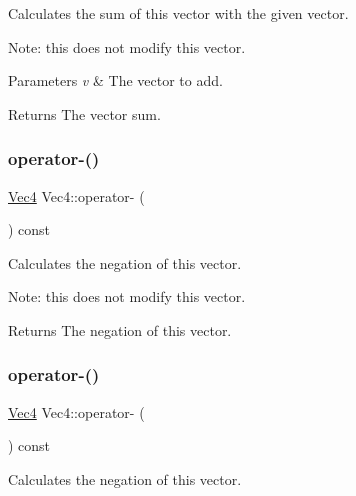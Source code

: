 Calculates the sum of this vector with the given vector.

Note\+: this does not modify this vector.


\begin{DoxyParams}{Parameters}
{\em v} & The vector to add. \\
\hline
\end{DoxyParams}
\begin{DoxyReturn}{Returns}
The vector sum. 
\end{DoxyReturn}
\mbox{\label{classVec4_a1638cef5793ee08b5a62bcb8dd06c17c}} 
\subsubsection{\texorpdfstring{operator-\/()}{operator-()}\hspace{0.1cm}{\footnotesize\ttfamily [3/4]}}
{\footnotesize\ttfamily \hyperlink{classVec4}{Vec4} Vec4\+::operator-\/ (\begin{DoxyParamCaption}{ }\end{DoxyParamCaption}) const\hspace{0.3cm}{\ttfamily [inline]}}

Calculates the negation of this vector.

Note\+: this does not modify this vector.

\begin{DoxyReturn}{Returns}
The negation of this vector. 
\end{DoxyReturn}
\mbox{\label{classVec4_a1638cef5793ee08b5a62bcb8dd06c17c}} 
\subsubsection{\texorpdfstring{operator-\/()}{operator-()}\hspace{0.1cm}{\footnotesize\ttfamily [4/4]}}
{\footnotesize\ttfamily \hyperlink{classVec4}{Vec4} Vec4\+::operator-\/ (\begin{DoxyParamCaption}{ }\end{DoxyParamCaption}) const\hspace{0.3cm}{\ttfamily [inline]}}

Calculates the negation of this vector.

